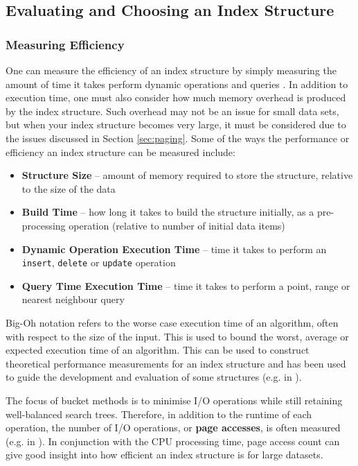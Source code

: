 \subsection{Evaluating and Choosing an Index Structure}
\label{sec:comparison}

\subsubsection{Measuring Efficiency}
\label{sec:measuring-efficiency}

One can measure the efficiency of an index structure by simply measuring the amount of time it takes perform dynamic operations and queries \cite{dynamic-data-structures}. In addition to execution time, one must also consider how much memory overhead is produced by the index structure. Such overhead may not be an issue for small data sets, but when your index structure becomes very large, it must be considered due to the issues discussed in Section \ref{sec:paging}. Some of the ways the performance or efficiency an index structure can be measured include:
\begin{itemize}
	\item \textbf{Structure Size} -- amount of memory required to store the structure, relative to the size of the data
	\item \textbf{Build Time} -- how long it takes to build the structure initially, as a pre-processing operation (relative to number of initial data items)
	\item \textbf{Dynamic Operation Execution Time} -- time it takes to perform an \texttt{insert}, \texttt{delete} or \texttt{update} operation
	\item \textbf{Query Time Execution Time} -- time it takes to perform a point, range or nearest neighbour query
\end{itemize}
Big-Oh notation \cite{design-analysis-algorithms} refers to the worse case execution time of an algorithm, often with respect to the size of the input. This is used to bound the worst, average or expected execution time of an algorithm. This can be used to construct theoretical performance measurements for an index structure and has been used to guide the development and evaluation of some structures (e.g. in  \cite{splay-quadtree}).

The focus of bucket methods is to minimise I/O operations while still retaining well-balanced search trees. Therefore, in addition to the runtime of each operation, the number of I/O operations, or \textbf{page accesses}, is often measured (e.g. in  \cite{pk-tree, pyramid-tree, x-tree}). In conjunction with the CPU processing time, page access count can give good insight into how efficient an index structure is for large datasets.

